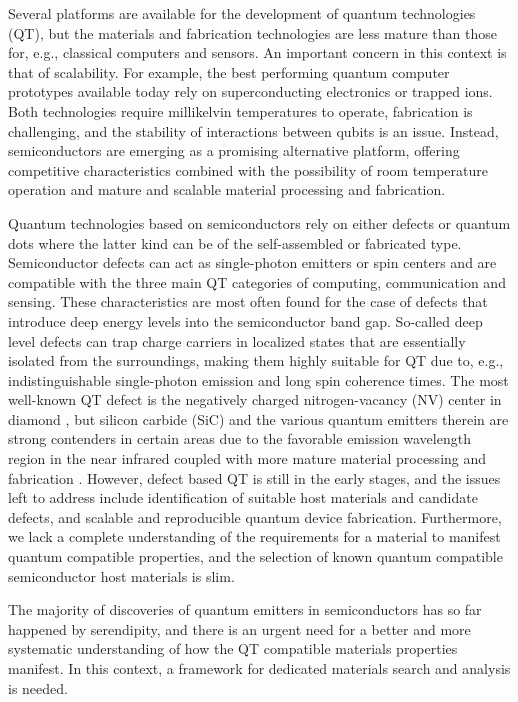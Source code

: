 \documentclass[superscriptaddress,unsortedaddress,
 amsmath,amssymb,
 aps,
]{revtex4-2}
\begin{document}
Several platforms are available for the development of quantum technologies (QT), but the materials and fabrication technologies are less mature than those for, e.g., classical computers and sensors. 
An important concern in this context is that of scalability. 
For example, the best performing quantum computer prototypes available today rely on superconducting electronics or trapped ions. Both technologies require millikelvin temperatures to operate, fabrication is challenging, and the stability of interactions between qubits is an issue. Instead, semiconductors are emerging as a promising alternative platform, offering competitive characteristics combined with the possibility of room temperature operation and mature and scalable material processing and fabrication.  

Quantum technologies based on semiconductors rely on either defects or quantum dots where the latter kind can be of the self-assembled or fabricated type. 
Semiconductor defects can act as single-photon emitters or spin centers and are compatible with the three main QT categories of computing, communication and sensing.  
These characteristics are most often found for the case of defects that introduce deep energy levels into the semiconductor band gap. So-called deep level defects can trap charge carriers in localized states that are essentially isolated from the surroundings, making them highly suitable for QT due to, e.g., indistinguishable single-photon emission and long spin coherence times. 
The most well-known QT defect is the negatively charged nitrogen-vacancy (NV) center in diamond \cite{Doherty_2013}, but silicon carbide (SiC) and the various quantum emitters therein are strong contenders in certain areas due to the favorable emission wavelength region in the near infrared coupled with more mature material processing and fabrication \cite{Bathen2021}. 
However, defect based QT is still in the early stages, and the issues left to address include identification of suitable host materials and candidate defects, and scalable and reproducible quantum device fabrication. 
Furthermore, we lack a complete understanding of the requirements for a material to manifest quantum compatible properties,  
and the selection of known quantum compatible semiconductor host materials is slim. 

The majority of discoveries of quantum emitters in semiconductors has so far happened by serendipity, and there is an urgent need for a better and more systematic understanding of how the QT compatible materials properties manifest. In this context, a framework for dedicated materials search and analysis is needed. 
\end{document}
